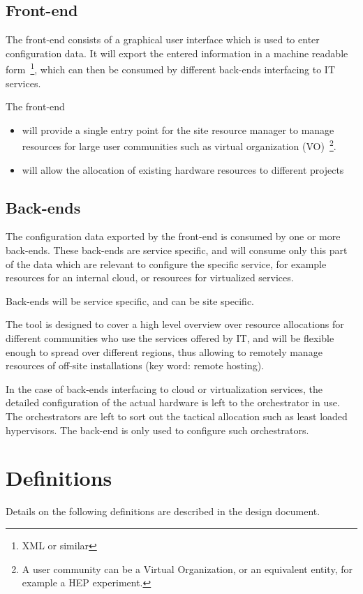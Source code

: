\documentclass[12pt]{article}
\begin{document}
\subsection{Front-end}
The front-end consists of a graphical user interface which is used to enter configuration data. It will export the entered information 
in a machine readable form~\footnote{XML or similar}, which can then be consumed by different back-ends interfacing to IT services.

The front-end 
\begin{itemize}
\item will provide a single entry point for the site resource manager to manage resources for large user communities such as virtual organization (VO)~\footnote{A user community can be a Virtual Organization, or an equivalent entity, for example a HEP experiment.}. 
\item will allow the allocation of existing hardware resources to different projects
\end{itemize}

 
\subsection{Back-ends}
The configuration data exported by the front-end is consumed by one or more back-ends. These back-ends are service specific, and will consume only
this part of the data which are relevant to configure the specific service, for example resources for an internal cloud, or resources for 
virtualized services. 

Back-ends will be service specific, and can be site specific. 

The tool is designed to cover a high level overview over resource allocations for different communities who use the services offered by IT, and will be flexible enough to spread over different regions, thus allowing to remotely manage resources of off-site installations (key word: remote hosting).

In the case of back-ends interfacing to cloud or virtualization services, the detailed configuration of the actual hardware is left to the orchestrator in use. The orchestrators are left to sort out the tactical allocation such as least loaded hypervisors. The back-end is only used to configure such orchestrators. 

\section{Definitions}
Details on the following definitions are described in the design document.
\end{document}
